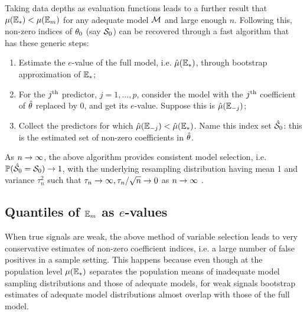 Taking data depths as evaluation functions leads to a further result that $\mu (\mathbb{E}_{* }) < \mu (\mathbb{E}_{m })$ for any adequate model $\mathcal{M}$ and large enough $n$. Following this, non-zero indices of ${\theta}_0$ (say $\mathcal{S}_0$) can be recovered through a fast algorithm that has these generic steps:

\begin{enumerate}
\item Estimate the $e$-value of the full model, i.e. $\hat \mu (\mathbb{E}_{* })$, through bootstrap approximation of $\mathbb{E}_{* }$;
\item For the $j^{\operatorname*{th}}$ predictor, $j=1,\ldots, p$, consider the model with the $j^{\operatorname*{th}}$ coefficient of $\hat {{\theta}}$ replaced by 0, and get its $e$-value. Suppose this is $\hat \mu (\mathbb{E}_{-j})$;
\item Collect the predictors for which $\hat \mu (\mathbb{E}_{-j}) < \hat \mu (\mathbb{E}_{* })$. Name this index set $\hat {\mathcal{S}}_0$: this is the estimated set of non-zero coefficients in $\hat {{\theta}}$.
\end{enumerate}

\noindent As $n \rightarrow \infty$, the above algorithm provides consistent model selection, i.e. $\mathbb{P} ( \hat {\mathcal{S}}_0 = \mathcal{S}_0) \rightarrow 1$, with the underlying resampling distribution having mean 1 and variance $\tau_n^2$ such that $\tau_n \rightarrow \infty, \tau_n/\sqrt n \rightarrow 0$ as $n \rightarrow \infty$ \citep{MajumdarChatterjee17}.

\subsection{Quantiles of $\mathbb{E}_{m }$ as $e$-values}
\label{subsec:quantileEvalue}
When true signals are weak, the above method of variable selection leads to very conservative estimates of non-zero coefficient indices, i.e. a large number of false positives in a sample setting. This happens because even though at the population level $\mu (\mathbb{E}_{* })$ separates the population means of inadequate model sampling distributions and those of adequate models, for weak signals bootstrap estimates of adequate model distributions almost overlap with those of the full model.

